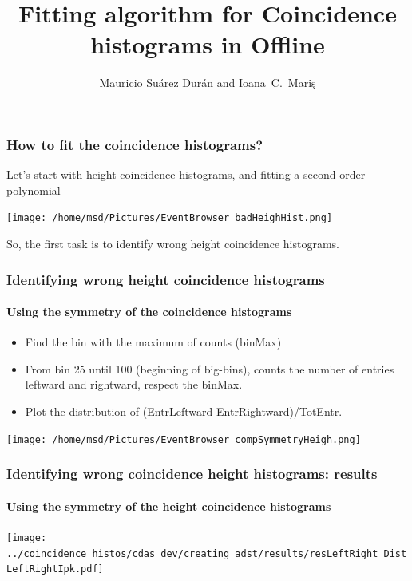 \documentclass[aspectratio=169]{beamer}
\title{Fitting algorithm for Coincidence histograms in Offline}
\author{
  Mauricio Su\'arez Dur\'an and Ioana~C.~Mari\c{s}
}
\institute{IIHE-ULB}
\begin{document}
\begin{frame}
  \titlepage
\end{frame}

\begin{frame}
  \frametitle{How to fit the coincidence histograms?}
  Let's start with height coincidence histograms, and fitting a
  second order polynomial

  \begin{center}
    \texttt{[image: /home/msd/Pictures/EventBrowser\_badHeighHist.png]}
  \end{center}
  So, the first task is to identify wrong height coincidence
  histograms.
\end{frame}

\begin{frame}
  \frametitle{Identifying wrong height coincidence histograms}
  \framesubtitle{Using the symmetry of the coincidence histograms}
  \vspace{0.5cm}

  \begin{itemize}
    \item Find the bin with the maximum of counts (binMax)
    \item From bin 25 until 100 (beginning of big-bins), counts the number of
      entries leftward and rightward, respect the binMax.
    \item Plot the distribution of
      (EntrLeftward-EntrRightward)/TotEntr.
  \end{itemize}

  \begin{center}
    \texttt{[image: /home/msd/Pictures/EventBrowser\_compSymmetryHeigh.png]}
  \end{center}
\end{frame}

\begin{frame}
  \frametitle{Identifying wrong coincidence height histograms:
  results}
  \framesubtitle{Using the symmetry of the height coincidence
  histograms}
  \begin{center}
    \texttt{[image: ../coincidence\_histos/cdas\_dev/creating\_adst/results/resLeftRight\_DistLeftRightIpk.pdf]}
  \end{center}
\end{frame}
\end{document}
